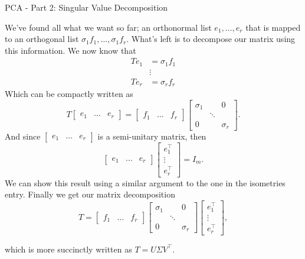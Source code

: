 \begin{entry}[3]{PCA - Part 2: Singular Value Decomposition}
\begin{entrysection}
\noindent We've  found all what we want so far; an orthonormal list $e_1,\ldots,e_r$ that is mapped to an orthogonal list $\sigma_1f_1,\ldots,\sigma_1f_r$. What's left is to decompose our matrix using this information. We now know that
\begin{align*}
Te_1 &= \sigma_1 f_1\\
&\vdots\\
Te_r &= \sigma_r f_r
\end{align*}
Which can be compactly written as
\[ T\begin{bmatrix}e_1 & \ldots & e_r\end{bmatrix} = \begin{bmatrix}f_1 & \ldots & f_r\end{bmatrix}
\begin{bmatrix}
  \sigma_1 & & 0\\
  & \ddots &\\
  0 & & \sigma_r
\end{bmatrix}. \]
And since $\begin{bmatrix}e_1 & \ldots & e_r\end{bmatrix}$ is a semi-unitary matrix, then
\[ \begin{bmatrix}e_1 & \ldots & e_r\end{bmatrix} \begin{bmatrix} e_1^{\top} \\ \vdots \\ e_r^{\top} \end{bmatrix} = I_m.\]
We can show this result using a similar argument to the one in the isometries entry. Finally we get our matrix decomposition
\[ T = \begin{bmatrix}f_1 & \ldots & f_r\end{bmatrix}
  \begin{bmatrix}
    \sigma_1 & & 0\\
    & \ddots &\\
    0 & & \sigma_r
  \end{bmatrix} \begin{bmatrix} e_1^{\top} \\ \vdots \\ e_r^{\top} \end{bmatrix}, \]
\end{entrysection}
which is more succinctly written as $T = U\Sigma V^{\top}$.
\end{entry}
